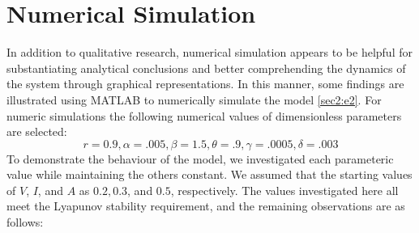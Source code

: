 \documentclass[12pt]{article}
\numberwithin{equation}{section}
\begin{document}
\section{Numerical Simulation}
In addition to qualitative research, numerical simulation appears to be helpful for substantiating analytical conclusions and better comprehending the dynamics of the system through graphical representations. In this manner, some findings are illustrated using MATLAB to numerically simulate the model \eqref{sec2:e2}. For numeric simulations the following numerical values of dimensionless parameters are selected:
\begin{equation}
r=0.9, \alpha=.005, \beta=1.5, \theta=.9, \gamma=.0005, \delta=.003
\end{equation}
To demonstrate the behaviour of the model, we investigated each parameteric value while maintaining the others constant. We assumed that the starting values of $V$, $I$, and $A$ as $0.2, 0.3$, and $0.5$, respectively. The values investigated here all meet the Lyapunov stability requirement, and the remaining observations are as follows:
\end{document}
